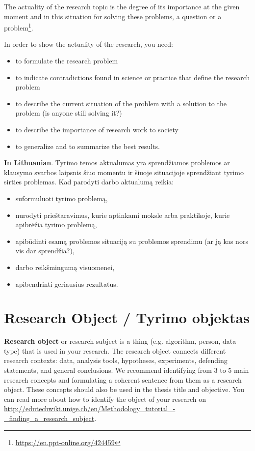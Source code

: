 The actuality of the research topic is the degree of its importance at the given moment and in this situation for solving these problems, a question or a problem\footnote{\url{https://en.ppt-online.org/424459}}.

In order to show the actuality of the research, you need:
\begin{itemize}
    \item to formulate the research problem
    \item to indicate contradictions found in science or practice that define the research problem
    \item to describe the current situation of the problem with a solution to the problem (is anyone still solving it?)
    \item to describe the importance of research work to society
    \item to generalize and to summarize the best results.
\end{itemize}

\textbf{In Lithuanian}.
Tyrimo temos aktualumas yra sprendžiamos problemos ar klausymo svarbos laipsnis šiuo momentu ir šiuoje situacijoje sprendžiant tyrimo sirties problemas.
Kad parodyti darbo aktualumą reikia:
\begin{itemize}
    \item suformuluoti tyrimo problemą,
    \item nurodyti prieštaravimus, kurie aptinkami moksle arba praktikoje, kurie apibrėžia tyrimo problemą, 
    \item apibūdinti esamą problemos situaciją su problemos sprendimu (ar ją kas nors vis dar sprendžia?),
    \item darbo reikšmingumą visuomenei,
    \item apibendrinti geriausius rezultatus.
\end{itemize}


\section*{Research Object / Tyrimo objektas}

\textbf{Research object} or research subject is a thing (e.g. algorithm, person, data type) that is used in your research. The research object connects different research contexts: data, analysis tools, hypotheses, experiments, defending statements, and general conclusions. We recommend identifying from 3 to 5 main research concepts and formulating a coherent sentence from them as a research object.
These concepts should also be used in the thesis title and objective. You can read more about how to identify the object of your research on  \url{http://edutechwiki.unige.ch/en/Methodology_tutorial_-_finding_a_research_subject}.

